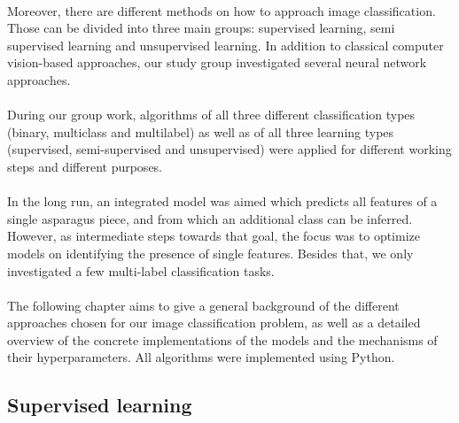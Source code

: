 \\
Moreover, there are different methods on how to approach image classification. Those can be divided into three main groups: supervised learning, semi supervised learning and unsupervised learning. In addition to classical computer vision-based approaches, our study group investigated several neural network approaches. \\
\\
During our group work, algorithms of all three different classification types (binary, multiclass and multilabel) as well as of all three learning types (supervised, semi-supervised and unsupervised) were applied for different working steps and different purposes. \\
\\
In the long run, an integrated model was aimed which predicts all features of a single asparagus piece, and from which an additional class can be inferred. However, as intermediate steps towards that goal, the focus was to optimize models on identifying the presence of single features. Besides that, we only investigated a few multi-label classification tasks.   \\
\\
The following chapter aims to give a general background of the different approaches chosen for our image classification problem, as well as a detailed overview of the concrete implementations of the models and the mechanisms of their hyperparameters. 
All algorithms were implemented using Python.  


\subsection{Supervised learning}
\label{sec:SupervisedLearning}

